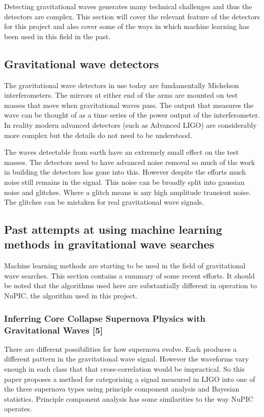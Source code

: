 \documentclass[a4paper]{jpconf}
\begin{document}
Detecting gravitational waves generates many technical challenges and thus the detectors are complex. This section will cover the relevant feature of the detectors for this project and also cover some of the ways in which machine learning has been used in this field in the past.

	\subsection{Gravitational wave detectors}
		The gravitational wave detectors in use today are fundamentally Michelson interferometers. The mirrors at either end of the arms are mounted on test masses that move when gravitational waves pass. The output that measures the wave can be thought of as a time series of the power output of the interferometer. In reality modern advanced detectors (such as Advanced LIGO) are considerably more complex but the details do not need to be understood.

	The waves detectable from earth have an extremely small effect on the test masses. The detectors need to have advanced noise removal so much of the work in building the detectors has gone into this. However despite the efforts much noise still remains in the signal. This noise can be broadly split into gaussian noise and glitches. Where a glitch means is any high amplitude transient noise. The glitches can be mistaken for real gravitational wave signals.

	\subsection{Past attempts at using machine learning methods in gravitational wave searches}
		Machine learning methods are starting to be used in the field of gravitational wave searches. This section contains a summary of some recent efforts. It should be noted that the algorithms used here are substantially different in operation to NuPIC, the algorithm used in this project.

		\subsubsection*{Inferring Core Collapse Supernova Physics with Gravitational Waves [5]}
			There are different possibilities for how supernova evolve. Each produces a different pattern in the gravitational wave signal. However the waveforms vary enough in each class that that cross-correlation would be impractical. So this paper proposes a method for categorising a signal measured in LIGO into one of the three supernova types using principle component analysis and Bayesian statistics. Principle component analysis has some similarities to the way NuPIC operates.
			
\end{document}

